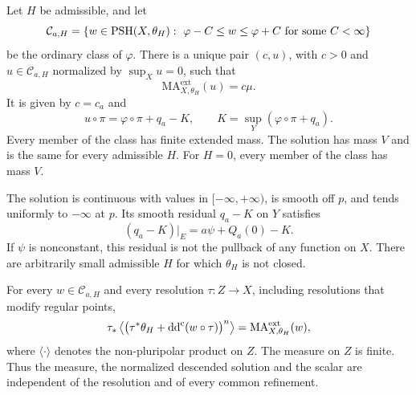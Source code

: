 \begin{theorem}\label{thm:cone-logarithmic-equation}
Let $H$ be admissible, and let
\[
\mathcal C_{a,H}=\{w\in\mathrm{PSH}(X,\theta_H):\ \varphi-C\leq w\leq\varphi+C\text{ for some }C<\infty\}
\]
be the ordinary class of $\varphi$. There is a unique pair $(c,u)$, with $c>0$ and $u\in\mathcal C_{a,H}$ normalized by $\sup_Xu=0$, such that
\[
\mathrm{MA}^{\mathrm{ext}}_{X,\theta_H}(u)=c\mu.
\]
It is given by $c=c_a$ and
\[
u\circ\pi=\varphi\circ\pi+q_a-K,\qquad K=\sup_Y(\varphi\circ\pi+q_a).
\]
Every member of the class has finite extended mass. The solution has mass $V$ and is the same for every admissible $H$. For $H=0$, every member of the class has mass $V$.

The solution is continuous with values in $[-\infty,+\infty)$, is smooth off $p$, and tends uniformly to $-\infty$ at $p$. Its smooth residual $q_a-K$ on $Y$ satisfies
\[
(q_a-K)|_E=a\psi+Q_a(0)-K.
\]
If $\psi$ is nonconstant, this residual is not the pullback of any function on $X$. There are arbitrarily small admissible $H$ for which $\theta_H$ is not closed.

For every $w\in\mathcal C_{a,H}$ and every resolution $\tau\colon Z\to X$, including resolutions that modify regular points,
\begin{equation}\label{eq:cone-resolution-pushforward}
\tau_*\left\langle\bigl(\tau^*\theta_H+\mathrm{dd}^{\mathrm{c}}(w\circ\tau)\bigr)^n\right\rangle=\mathrm{MA}^{\mathrm{ext}}_{X,\theta_H}(w),
\end{equation}
where $\langle\cdot\rangle$ denotes the non-pluripolar product on $Z$. The measure on $Z$ is finite. Thus the measure, the normalized descended solution and the scalar are independent of the resolution and of every common refinement.
\end{theorem}

